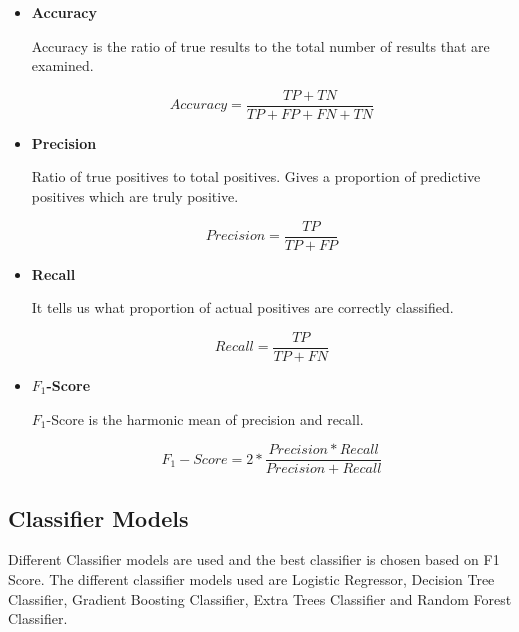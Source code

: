 \documentclass[12pt,letter-paper]{article}
\begin{document}
        \begin{itemize}
            \item\textbf{Accuracy}
            
                 Accuracy is the ratio of true results to the total number of results that are examined.
             
                \[Accuracy = \frac{TP + TN }{TP + FP + FN + TN}\]
                
            
            \item\textbf{Precision}
            
                Ratio of true positives to total positives. Gives a proportion of predictive positives which are truly positive.
            
                \[Precision = \frac{TP}{TP + FP}\]
            
            \item\textbf{Recall}
            
                It tells us what proportion of actual positives are correctly classified.
            
                \[Recall = \frac{TP}{TP + FN}\]
            
            \item\textbf{$F_1$-Score}
            
                $F_1$-Score is the harmonic mean of precision and recall.
            
                \[F_1-Score = 2 * \frac{Precision * Recall}{Precision + Recall}\]
            
        \end{itemize}
        
    \subsection{Classifier Models}
    
        Different Classifier models are used and the best classifier is chosen based on F1 Score. The different classifier models used are Logistic Regressor, Decision Tree Classifier, Gradient Boosting Classifier, Extra Trees Classifier and Random Forest Classifier.
    
\end{document}
